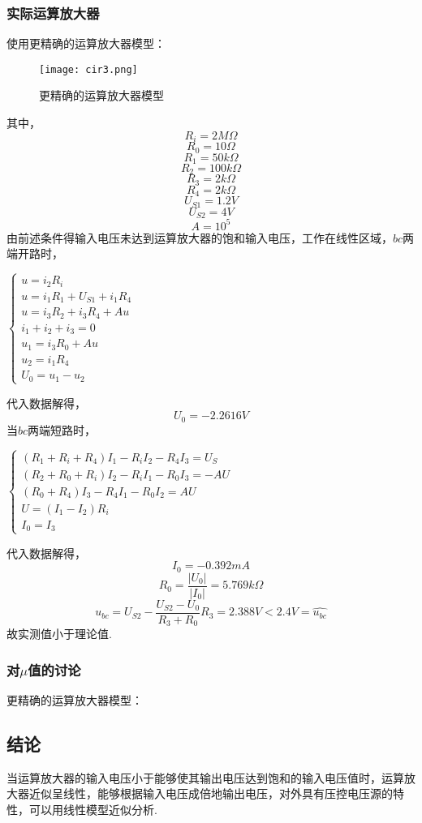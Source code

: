 \documentclass[12pt,a4paper,oneside,left=3.18,right=3.18,top=2.54,bottom=2.54]{ctexart}
\begin{document}
		\subsubsection{实际运算放大器}
		使用更精确的运算放大器模型：
		\begin{figure}[H]
		\centering
		\texttt{[image: cir3.png]}
		\caption{更精确的运算放大器模型}
		\label{figure3}
		\end{figure}
		其中，
		$$R_i=2M\Omega$$
		$$R_0=10\Omega$$
		$$R_1=50k\Omega$$
		$$R_2=100k\Omega$$
		$$R_3=2k\Omega$$
		$$R_4=2k\Omega$$
		$$U_{S1}=1.2V$$
		$$U_{S2}=4V$$
		$$A=10^5$$
		由前述条件得输入电压未达到运算放大器的饱和输入电压，工作在线性区域，$bc$两端开路时，\par
		\begin{center}
		\(
		\begin{cases}
		u=i_2R_i\\
		u=i_1R_1+U_{S1}+i_1R_4\\
		u=i_3R_2+i_3R_4+Au\\
		i_1+i_2+i_3=0\\
		u_1=i_3R_0+Au\\
		u_2=i_1R_4\\
		U_0=u_1-u_2
		\end{cases}
		\)\par
		\end{center}
		代入数据解得，
		$$U_0=-2.2616V$$
		当$bc$两端短路时，
		\begin{center}
		\(
		\begin{cases}
		(R_1+R_i+R_4)I_1-R_iI_2-R_4I_3=U_S\\
		(R_2+R_0+R_i)I_2-R_iI_1-R_0I_3=-AU\\
		(R_0+R_4)I_3-R_4I_1-R_0I_2=AU\\
		U=(I_1-I_2)R_i\\
		I_0=I_3
		\end{cases}
		\)\par
		\end{center}
		代入数据解得，
		$$I_0=-0.392mA$$
		$$R_0=\dfrac{|U_0|}{|I_0|}=5.769k\Omega$$
		$$u_{bc}=U_{S2}-\dfrac{U_{S2}-U_0}{R_3+R_0}R_3=2.388V<2.4V=\hat{u_{bc}}$$
		故实测值小于理论值.
		\subsubsection{对$\mu$值的讨论}
		更精确的运算放大器模型：
		
	\subsection{结论}
	当运算放大器的输入电压小于能够使其输出电压达到饱和的输入电压值时，运算放大器近似呈线性，能够根据输入电压成倍地输出电压，对外具有压控电压源的特性，可以用线性模型近似分析.
\end{document}
